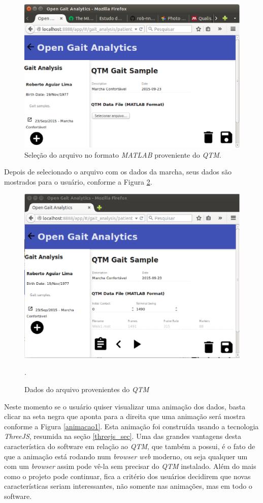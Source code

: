 \begin{figure}[ht]
	\centering
	\includegraphics[width=15cm]{figuras/tela6.eps}
	\caption{Seleção do arquivo no formato \emph{MATLAB} proveniente do \emph{QTM}.}
	\label{tela6}
\end{figure}

Depois de selecionado o arquivo com os dados da marcha, seus dados são mostrados para o usuário, conforme a Figura \ref{tela7}.


\begin{figure}[ht]
	\centering
	\includegraphics[width=15cm]{figuras/tela7.eps}
	\caption{Dados do arquivo provenientes do \emph{QTM}}.
	\label{tela7}
\end{figure}


Neste momento se o usuário quiser visualizar uma animação dos dados, basta clicar na seta negra que aponta para a direita que uma animação será mostra conforme a Figura \ref{animacao1}.
Esta animação foi construída usando a tecnologia \emph{ThreeJS}, resumida na seção \ref{threejs_sec}. Uma das grandes vantagens desta característica do software em relação ao \emph{QTM}, que também a possui, é o fato de que a animação está rodando num \emph{browser web} moderno, ou seja qualquer um com um \emph{browser} assim pode vê-la sem precisar do \emph{QTM} instalado. 
Além do mais como o projeto pode continuar, fica a critério dos usuários decidirem que novas características seriam interessantes, não somente nas animações, mas em todo o software.


